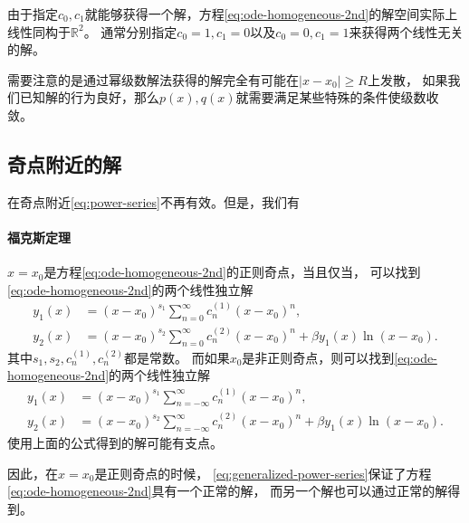 \documentclass[UTF8]{ctexart}
\newcommand*{\reals}{\mathbb{R}}
\begin{document}
由于指定$c_0, c_1$就能够获得一个解，方程\eqref{eq:ode-homogeneous-2nd}的解空间实际上线性同构于$\reals^2$。
通常分别指定$c_0 = 1, c_1 = 0$以及$c_0 = 0, c_1 = 1$来获得两个线性无关的解。

需要注意的是通过幂级数解法获得的解完全有可能在$|x-x_0|\geq R$上发散，
如果我们已知解的行为良好，那么$p(x), q(x)$就需要满足某些特殊的条件使级数收敛。

\subsection{奇点附近的解}

在奇点附近\eqref{eq:power-series}不再有效。但是，我们有
\paragraph{福克斯定理} $x=x_0$是方程\eqref{eq:ode-homogeneous-2nd}的正则奇点，当且仅当，
可以找到\eqref{eq:ode-homogeneous-2nd}的两个线性独立解
\begin{equation}
    \begin{aligned}
        y_1(x) &= (x-x_0)^{s_1} \sum_{n=0}^\infty c_n^{(1)}(x-x_0)^n, \\
        y_2(x) &= (x-x_0)^{s_2} \sum_{n=0}^\infty c_n^{(2)}(x-x_0)^n + \beta y_1(x) \ln (x-x_0).
        \end{aligned}
        \label{eq:generalized-power-series}
\end{equation}
其中$s_1, s_2, c_n^{(1)}, c_n^{(2)}$都是常数。
而如果$x_0$是非正则奇点，则可以找到\eqref{eq:ode-homogeneous-2nd}的两个线性独立解
\begin{equation}
    \begin{aligned}
        y_1(x) &= (x-x_0)^{s_1} \sum_{n=-\infty}^\infty c_n^{(1)}(x-x_0)^n, \\
        y_2(x) &= (x-x_0)^{s_2} \sum_{n=-\infty}^\infty c_n^{(2)}(x-x_0)^n + \beta y_1(x) \ln (x-x_0).
    \end{aligned}
\end{equation}
使用上面的公式得到的解可能有支点。

因此，在$x=x_0$是正则奇点的时候，
\eqref{eq:generalized-power-series}保证了方程\eqref{eq:ode-homogeneous-2nd}具有一个正常的解，
而另一个解也可以通过正常的解得到。
\end{document}
